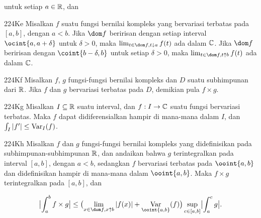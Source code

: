 
\noindent untuk setiap $a\in\Bbb R$, dan



\spheader 224Ke Misalkan $f$ suatu fungsi bernilai kompleks yang
bervariasi terbatas pada $[a,b]$, dengan $a<b$. Jika $\dom f$ beririsan
dengan setiap interval $\ocint{a,a+\delta}$ untuk $\delta>0$, maka
 $\lim_{t\in\dom f,t\downarrow a}f(t)$
ada dalam $\Bbb C$. Jika $\dom f$ beririsan dengan
$\coint{b-\delta,b}$ untuk setiap $\delta>0$, maka
$\lim_{t\in\dom f,t\uparrow b}f(t)$
ada dalam $\Bbb C$. 

\spheader 224Kf Misalkan $f$, $g$ fungsi-fungsi bernilai kompleks dan $D$ suatu
subhimpunan dari $\Bbb R$. Jika $f$ dan $g$ bervariasi terbatas pada $D$,
demikian pula $f\times g$. 

\spheader 224Kg Misalkan $I\subseteq\Bbb R$ suatu interval, dan
$f:I\to\Bbb C$ suatu fungsi bervariasi terbatas. Maka $f$ dapat
didiferensialkan hampir di mana-mana dalam $I$, dan
$\int_I|f'|\le\mathop{\text{Var}}_I(f)$.

\spheader 224Kh Misalkan $f$ dan $g$ fungsi-fungsi bernilai kompleks yang
didefinisikan pada subhimpunan-subhimpunan $\Bbb R$, dan andaikan bahwa
$g$ terintegralkan pada interval $[a,b]$, dengan $a<b$, sedangkan $f$
bervariasi terbatas pada $\ooint{a,b}$ dan didefinisikan hampir di
mana-mana dalam $\ooint{a,b}$. Maka $f\times g$ terintegralkan pada
$[a,b]$, dan

$$\bigl|\int_a^bf\times g\bigr|
\le\bigl(\lim_{x\in\dom f,x\uparrow b}|f(x)|+\Var_{\ooint{a,b}}(f)\bigr)
  \sup_{c\in[a,b]}\bigl|\int_a^cg\bigr|.$$


